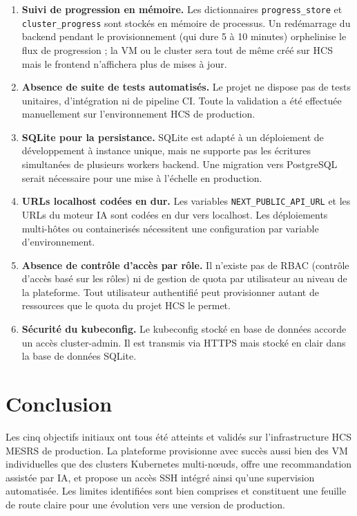 \begin{enumerate}
  \item \textbf{Suivi de progression en mémoire.} Les dictionnaires
        \texttt{progress\_store} et \texttt{cluster\_progress} sont stockés en mémoire
        de processus. Un redémarrage du backend pendant le provisionnement (qui dure
        5 à 10 minutes) orphelinise le flux de progression ; la VM ou le cluster sera
        tout de même créé sur HCS mais le frontend n'affichera plus de mises à jour.

  \item \textbf{Absence de suite de tests automatisés.} Le projet ne dispose pas de
        tests unitaires, d'intégration ni de pipeline CI. Toute la validation a été
        effectuée manuellement sur l'environnement HCS de production.

  \item \textbf{SQLite pour la persistance.} SQLite est adapté à un déploiement de
        développement à instance unique, mais ne supporte pas les écritures simultanées
        de plusieurs workers backend. Une migration vers PostgreSQL serait nécessaire
        pour une mise à l'échelle en production.

  \item \textbf{URLs localhost codées en dur.} Les variables \texttt{NEXT\_PUBLIC\_API\_URL}
        et les URLs du moteur IA sont codées en dur vers localhost. Les déploiements
        multi-hôtes ou containerisés nécessitent une configuration par variable
        d'environnement.

  \item \textbf{Absence de contrôle d'accès par rôle.} Il n'existe pas de RBAC
        (contrôle d'accès basé sur les rôles) ni de gestion de quota par utilisateur
        au niveau de la plateforme. Tout utilisateur authentifié peut provisionner
        autant de ressources que le quota du projet HCS le permet.

  \item \textbf{Sécurité du kubeconfig.} Le kubeconfig stocké en base de données
        accorde un accès cluster-admin. Il est transmis via HTTPS mais stocké en clair
        dans la base de données SQLite.
\end{enumerate}

\section{Conclusion}

Les cinq objectifs initiaux ont tous été atteints et validés sur l'infrastructure HCS
MESRS de production. La plateforme provisionne avec succès aussi bien des VM
individuelles que des clusters Kubernetes multi-nœuds, offre une recommandation
assistée par IA, et propose un accès SSH intégré ainsi qu'une supervision automatisée.
Les limites identifiées sont bien comprises et constituent une feuille de route claire
pour une évolution vers une version de production.
